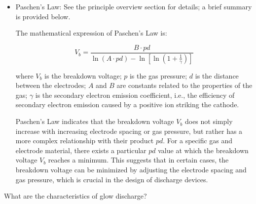 \begin{itemize}
\begin{enumerate}
		Under the continuous influence of the electric field, the processes of ionization and recombination (recombination of electrons with ions) will reach a dynamic equilibrium, resulting in a stable current, and the gas discharge enters a steady state. If the applied electric field is weakened or removed, the ionization process will cease, electrons and ions will gradually recombine, and the gas will return to its insulating state, ending the discharge.
	\end{enumerate}
	
	\item Paschen's Law: See the principle overview section for details; a brief summary is provided below.
	
	The mathematical expression of Paschen's Law is:
	
	\[
	V_b = \frac{B \cdot pd}{\ln(A \cdot pd) - \ln[\ln(1 + \frac{1}{\gamma})]}
	\]
	
	where \( V_b \) is the breakdown voltage; \( p \) is the gas pressure; \( d \) is the distance between the electrodes; \( A \) and \( B \) are constants related to the properties of the gas; \( \gamma \) is the secondary electron emission coefficient, i.e., the efficiency of secondary electron emission caused by a positive ion striking the cathode.
	
	Paschen's Law indicates that the breakdown voltage \( V_b \) does not simply increase with increasing electrode spacing or gas pressure, but rather has a more complex relationship with their product \( pd \). For a specific gas and electrode material, there exists a particular \( pd \) value at which the breakdown voltage \( V_b \) reaches a minimum. This suggests that in certain cases, the breakdown voltage can be minimized by adjusting the electrode spacing and gas pressure, which is crucial in the design of discharge devices.
\end{itemize}

\begin{question}
	What are the characteristics of glow discharge?
\end{question}

